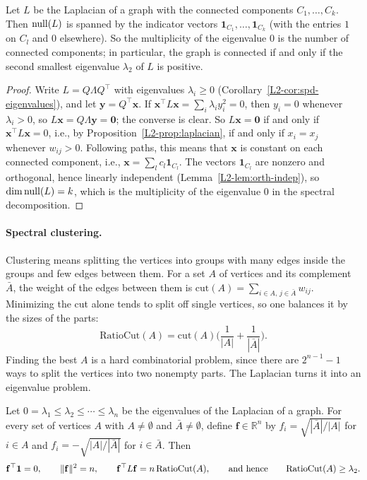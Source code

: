 \begin{theorem}\label{L2-thm:laplacian-components}
    Let $L$ be the Laplacian of a graph with the connected components $C_1, \ldots, C_k$. Then $\operatorname{null}(L)$ is spanned by the indicator vectors $\mathbf{1}_{C_1}, \ldots, \mathbf{1}_{C_k}$ (with the entries $1$ on $C_l$ and $0$ elsewhere). So the multiplicity of the eigenvalue $0$ is the number of connected components; in particular, the graph is connected if and only if the second smallest eigenvalue $\lambda_2$ of $L$ is positive.
\end{theorem}

\begin{proof}
    Write $L = Q\Lambda Q^\top$ with eigenvalues $\lambda_i \geq 0$ (Corollary~\ref{L2-cor:spd-eigenvalues}), and let $\mathbf{y} = Q^\top \mathbf{x}$. If $\mathbf{x}^\top L\mathbf{x} = \sum_i \lambda_iy_i^2 = 0$, then $y_i = 0$ whenever $\lambda_i > 0$, so $L\mathbf{x} = Q\Lambda \mathbf{y} = \mathbf{0}$; the converse is clear. So $L\mathbf{x} = \mathbf{0}$ if and only if $\mathbf{x}^\top L\mathbf{x} = 0$, i.e., by Proposition~\ref{L2-prop:laplacian}, if and only if $x_i = x_j$ whenever $w_{ij} > 0$. Following paths, this means that $\mathbf{x}$ is constant on each connected component, i.e., $\mathbf{x} = \sum_l c_l\mathbf{1}_{C_l}$. The vectors $\mathbf{1}_{C_l}$ are nonzero and orthogonal, hence linearly independent (Lemma~\ref{L2-lem:orth-indep}), so $\dim\operatorname{null}(L) = k$, which is the multiplicity of the eigenvalue $0$ in the spectral decomposition.
\end{proof}

\paragraph{Spectral clustering.} Clustering means splitting the vertices into groups with many edges inside the groups and few edges between them. For a set $A$ of vertices and its complement $\bar{A}$, the weight of the edges between them is $\mathrm{cut}(A) = \sum_{i \in A, \, j \in \bar{A}} w_{ij}$. Minimizing the cut alone tends to split off single vertices, so one balances it by the sizes of the parts:
\[\mathrm{RatioCut}(A) = \mathrm{cut}(A)\Big(\frac{1}{|A|} + \frac{1}{|\bar{A}|}\Big).\]
Finding the best $A$ is a hard combinatorial problem, since there are $2^{n-1} - 1$ ways to split the vertices into two nonempty parts. The Laplacian turns it into an eigenvalue problem.

\begin{theorem}\label{L2-thm:ratio-cut}
    Let $0 = \lambda_1 \leq \lambda_2 \leq \cdots \leq \lambda_n$ be the eigenvalues of the Laplacian of a graph. For every set of vertices $A$ with $A \neq \emptyset$ and $\bar{A} \neq \emptyset$, define $\mathbf{f} \in \mathbb{R}^n$ by $f_i = \sqrt{|\bar{A}|/|A|}$ for $i \in A$ and $f_i = -\sqrt{|A|/|\bar{A}|}$ for $i \in \bar{A}$. Then
    \[\mathbf{f}^\top\mathbf{1} = 0, \qquad \lVert \mathbf{f} \rVert^2 = n, \qquad \mathbf{f}^\top L\mathbf{f} = n\,\mathrm{RatioCut}(A), \qquad \text{and hence} \qquad \mathrm{RatioCut}(A) \geq \lambda_2.\]
\end{theorem}

